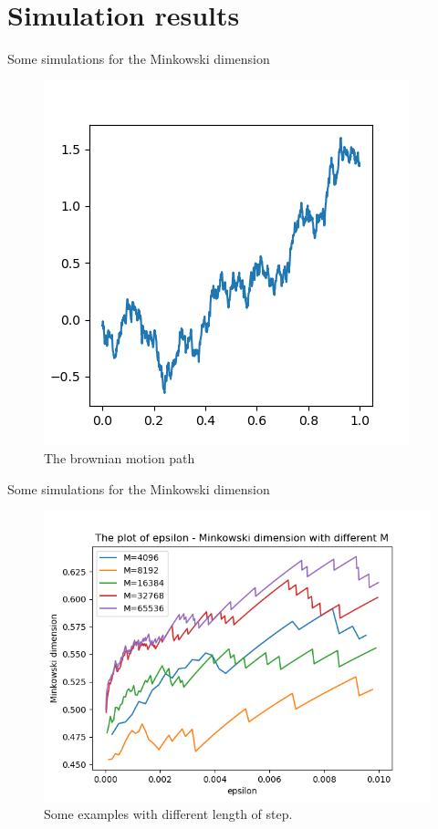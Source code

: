 \documentclass[t]{beamer}
\begin{document}
\section{Simulation results}

\begin{frame}{Some simulations for the Minkowski dimension}
    \begin{figure}
        \centering
        \includegraphics[scale=0.60]{brownian_motion.png}
        \caption{The brownian motion path}
        \label{fig:brownian_motion}
    \end{figure}
\end{frame}

\begin{frame}{Some simulations for the Minkowski dimension}
    \begin{figure}
        \centering
        \includegraphics[scale=0.50]{differentM.png}
        \caption{Some examples with different length of step.}
        \label{fig:different_step}
    \end{figure}
\end{frame}
\end{document}

